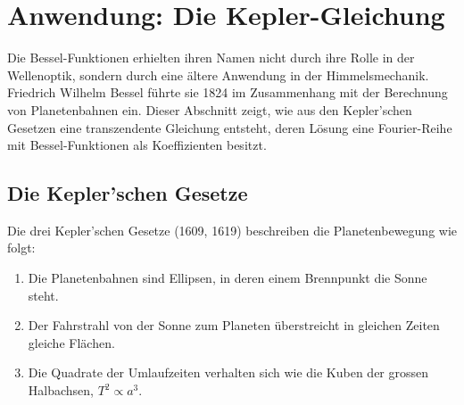 %
%
%
%
\section{Anwendung: Die Kepler-Gleichung
\label{bessel:section:kepler}}
%

Die Bessel-Funktionen erhielten ihren Namen nicht durch ihre Rolle in der Wellenoptik, sondern durch eine ältere Anwendung in der Himmelsmechanik.
Friedrich Wilhelm Bessel führte sie 1824 im Zusammenhang mit der Berechnung von Planetenbahnen ein.
Dieser Abschnitt zeigt, wie aus den Kepler'schen Gesetzen eine transzendente Gleichung entsteht, deren Lösung eine Fourier-Reihe mit Bessel-Funktionen als Koeffizienten besitzt.

\subsection{Die Kepler'schen Gesetze
\label{bessel:subsection:keplergesetze}}

Die drei Kepler'schen Gesetze (1609, 1619) beschreiben die Planetenbewegung wie folgt:
\begin{enumerate}
\item Die Planetenbahnen sind Ellipsen, in deren einem Brennpunkt die Sonne steht.
\item Der Fahrstrahl von der Sonne zum Planeten überstreicht in gleichen Zeiten gleiche Flächen.
\item Die Quadrate der Umlaufzeiten verhalten sich wie die Kuben der grossen Halbachsen, $T^2 \propto a^3$.
\end{enumerate}

